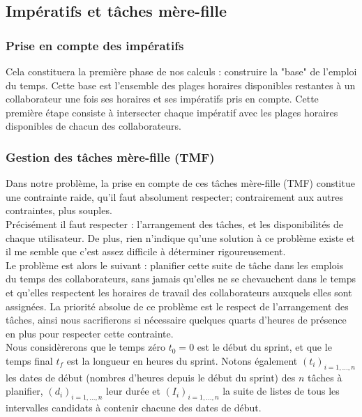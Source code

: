 \documentclass[12pt]{article}
\begin{document}
\subsection{Impératifs et tâches mère-fille}
\subsubsection{Prise en compte des impératifs}
Cela constituera la première phase de nos calculs : construire la "base" de l'emploi du temps. Cette base est l'ensemble des plages horaires disponibles restantes à un collaborateur une fois ses horaires et ses impératifs pris en compte. Cette première étape consiste à intersecter chaque impératif avec les plages horaires disponibles de chacun des collaborateurs. 

\subsubsection{Gestion des tâches mère-fille (TMF)}
Dans notre problème, la prise en compte de ces tâches mère-fille (TMF) constitue une contrainte raide, qu'il faut absolument respecter; contrairement aux autres contraintes, plus souples.
\\

Précisément il faut respecter : l'arrangement des tâches, et les disponibilités de chaque utilisateur. De plus, rien n'indique qu'une solution à ce problème existe et il me semble que c'est assez difficile à déterminer rigoureusement.\\

Le problème est alors le suivant : planifier cette suite de tâche dans les emplois du temps des collaborateurs, sans jamais qu'elles ne se chevauchent dans le temps et qu'elles respectent les horaires de travail des collaborateurs auxquels elles sont assignées. La priorité absolue de ce problème est le respect de l'arrangement des tâches, ainsi nous sacrifierons si nécessaire quelques quarts d'heures de présence en plus pour respecter cette contrainte.\\


Nous considèrerons que le temps zéro $t_0 = 0$ est le début du sprint, et que le temps final $t_f$ est la longueur en heures du sprint. Notons également $(t_i)_{i=1,...,n}$ les dates de début (nombres d'heures depuis le début du sprint) des $n$ tâches à planifier, $(d_i)_{i=1,...,n}$ leur durée et $(I_i)_{i=1,...,n}$ la suite de listes de tous les intervalles candidats à contenir chacune des dates de début.
\end{document}
